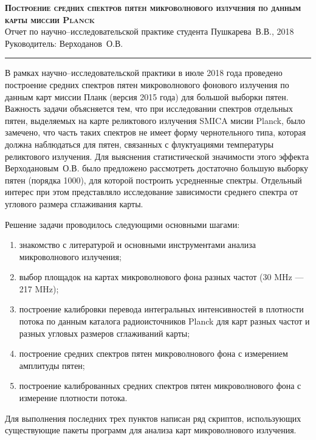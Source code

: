 \documentclass[12pt,a4paper]{extarticle}
\begin{document}
\begin{center}
\textbf{\textsc{Построение средних спектров пятен микроволнового излучения по данным карты миссии Planck}}\\
Отчет по научно--исследовательской практике студента Пушкарева~В.В., 2018
Руководитель: Верходанов~О.В.
\vskip10pt
\hrule
\vskip20pt
\end{center}

В рамках научно--исследовательской практики в июле 2018 года проведено построение средних спектров пятен микроволнового фонового излучения по данным карт миссии Планк (версия 2015 года) для большой выборки пятен. Важность задачи объясняется тем, что при исследовании спектров отдельных пятен, выделяемых на карте реликтового излучения SMICA мисии Planck, было замечено, что часть таких спектров не имеет форму чернотельного типа, которая должна наблюдаться для пятен, связанных с флуктуациями температуры реликтового излучения. Для выяснения статистической значимости этого эффекта Верходановым~О.В. было предложено рассмотреть достаточно большую выборку пятен (порядка 1000), для которой построить усредненные спектры. Отдельный интерес при этом представляло исследование зависимости среднего спектра от углового размера сглаживания карты.

Решение задачи проводилось следующими основными шагами:
\begin{enumerate}
\item знакомство с литературой и основными инструментами анализа микроволнового излучения;
\item выбор площадок на картах микроволнового фона разных частот (30 MHz --- 217 MHz);
\item построение калибровки перевода интегральных интенсивностей в плотности потока по данным каталога радиоисточников Planck для карт разных частот и разных угловых размеров сглаживаний карты;
\item построение средних спектров пятен микроволнового фона с измерением амплитуды пятен;
\item построение калиброванных средних спектров пятен микроволнового фона с измерение плотности потока.
\end{enumerate} 
Для выполнения последних трех пунктов написан ряд скриптов, использующих существующие пакеты программ для анализа карт микроволнового излучения.
\end{document}
